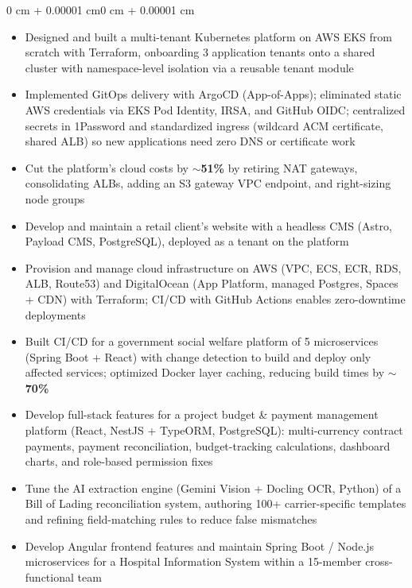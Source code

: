 \documentclass[10pt, letterpaper]{article}
\newenvironment{highlights}{
    \begin{itemize}[
        topsep=0.055 cm,
        parsep=0.055 cm,
        partopsep=0pt,
        itemsep=0pt,
        leftmargin=0.4 cm + 10pt
    ]
}{
    \end{itemize}
}
\newenvironment{onecolentry}{
    \begin{adjustwidth}{0 cm + 0.00001 cm}{0 cm + 0.00001 cm}
}{
    \end{adjustwidth}
}
\begin{document}
        \vspace{0.08 cm}
        \begin{onecolentry}
            \begin{highlights}
                \item Designed and built a multi-tenant Kubernetes platform on AWS EKS from scratch with Terraform, onboarding 3 application tenants onto a shared cluster with namespace-level isolation via a reusable tenant module
                \item Implemented GitOps delivery with ArgoCD (App-of-Apps); eliminated static AWS credentials via EKS Pod Identity, IRSA, and GitHub OIDC; centralized secrets in 1Password and standardized ingress (wildcard ACM certificate, shared ALB) so new applications need zero DNS or certificate work
                \item Cut the platform's cloud costs by \textbf{$\sim$51\%} by retiring NAT gateways, consolidating ALBs, adding an S3 gateway VPC endpoint, and right-sizing node groups
                \item Develop and maintain a retail client's website with a headless CMS (Astro, Payload CMS, PostgreSQL), deployed as a tenant on the platform
                \item Provision and manage cloud infrastructure on AWS (VPC, ECS, ECR, RDS, ALB, Route53) and DigitalOcean (App Platform, managed Postgres, Spaces + CDN) with Terraform; CI/CD with GitHub Actions enables zero-downtime deployments
                \item Built CI/CD for a government social welfare platform of 5 microservices (Spring Boot + React) with change detection to build and deploy only affected services; optimized Docker layer caching, reducing build times by \textbf{$\sim$70\%}
                \item Develop full-stack features for a project budget \& payment management platform (React, NestJS + TypeORM, PostgreSQL): multi-currency contract payments, payment reconciliation, budget-tracking calculations, dashboard charts, and role-based permission fixes
                \item Tune the AI extraction engine (Gemini Vision + Docling OCR, Python) of a Bill of Lading reconciliation system, authoring 100+ carrier-specific templates and refining field-matching rules to reduce false mismatches
                \item Develop Angular frontend features and maintain Spring Boot / Node.js microservices for a Hospital Information System within a 15-member cross-functional team
            \end{highlights}
        \end{onecolentry}
\end{document}
